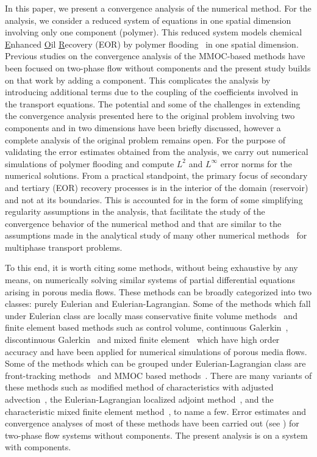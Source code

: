\documentclass[11pt]{article}
\newcommand{\ul}{\underline}
\begin{document}
In this paper, we present a convergence analysis of the numerical method. For the analysis, we consider a reduced system of equations in one spatial dimension involving only one component (polymer). This reduced system models chemical \ul{E}nhanced \ul{O}il \ul{R}ecovery (EOR) by polymer flooding~\cite{DGLM1988-1,DGLM1988-2} in one spatial dimension. Previous studies \cite{DR1982,D1983} on the convergence analysis of the MMOC-based methods have been focused on two-phase flow without components and the present study builds on that work by adding a component. This complicates the analysis by introducing additional terms due to the coupling of the coefficients involved in the transport equations. The potential and some of the challenges in extending the convergence analysis presented here to the original problem involving two components and in two dimensions have been briefly discussed, however a complete analysis of the original problem remains open. For the purpose of validating the error estimates obtained from the analysis, we carry out numerical simulations of polymer flooding and compute $L^2$ and $L^\infty$ error norms for the numerical solutions. From a practical standpoint, the primary focus of secondary and tertiary (EOR) recovery processes is in the interior of the domain (reservoir) and not at its boundaries. 
This is accounted for in the form of some simplifying regularity assumptions in the analysis, that facilitate the study of the convergence behavior of the numerical method and that are similar to the assumptions made in the analytical study of many other numerical methods~\cite{D1983,EW1980,R1985} for multiphase transport problems. 

To this end, it is worth citing some methods, without being exhaustive by any means, on numerically solving similar systems of partial differential equations arising in porous media flows. These methods can be broadly categorized into two classes: purely Eulerian and Eulerian-Lagrangian. Some of the methods which fall under Eulerian class are locally mass conservative finite volume methods~\cite{D1993,CPV2014} and finite element based methods such as control volume, continuous Galerkin~\cite{EHM2003}, discontinuous Galerkin~\cite{CCSS2001,KP2016} and mixed finite element~\cite{NSM2004} which have high order accuracy and have been applied for numerical simulations of porous media flows. Some of the methods which can be grouped under Eulerian-Lagrangian class are front-tracking methods~\cite{DGLM1988-1,DGLM1988-2} and MMOC based methods~\cite{DR1982,D1983}. There are many variants of these methods such as modified method of characteristics with adjusted advection~\cite{DHP1999}, the Eulerian-Lagrangian localized adjoint method~\cite{CRHE1990}, and the characteristic mixed finite element method~\cite{AW1995}, to name a few. Error estimates and convergence analyses of most of these methods have been carried out (see \cite{DR1982,CCSS2001,AW1995,W2000,WW2007,BK2012}) for two-phase flow systems without components. The present analysis is on a system with components.
\end{document}
